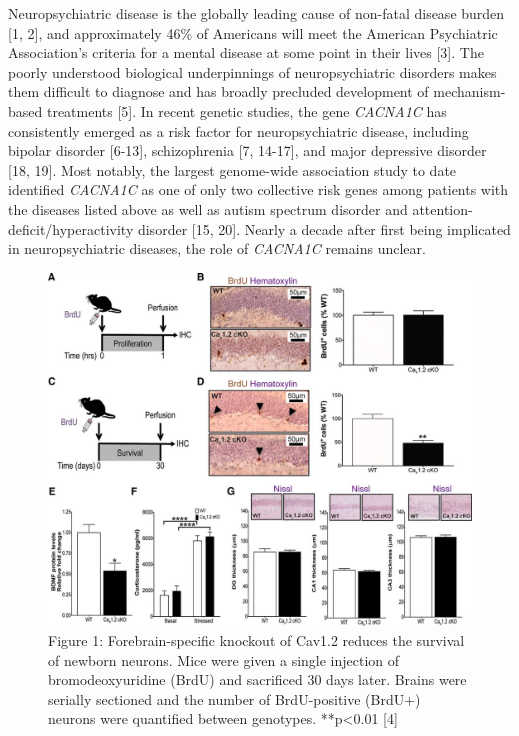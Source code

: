 \documentclass[]{article}
\date{}
\begin{document}
Neuropsychiatric disease is the globally leading cause of non-fatal disease burden {[}1,
2{]}, and approximately 46\% of Americans will meet the American
Psychiatric Association's criteria for a mental disease at some point
in their lives {[}3{]}.
The poorly understood biological underpinnings of neuropsychiatric disorders makes them 
difficult to diagnose and has broadly precluded development of mechanism-based treatments {[}5{]}. 
In recent genetic studies, the gene \emph{CACNA1C} has consistently emerged as a
risk factor for neuropsychiatric disease, including bipolar disorder
{[}6-13{]}, schizophrenia {[}7, 14-17{]}, and major depressive disorder
{[}18, 19{]}.  
Most notably, the largest genome-wide association study to
date identified \emph{CACNA1C} as one of only two collective risk genes
among patients with the diseases listed above as well as autism spectrum
disorder and attention-deficit/hyperactivity disorder {[}15, 20{]}. 
Nearly a decade after first being implicated in neuropsychiatric diseases, the role of
\emph{CACNA1C} remains unclear.

\begin{figure}[h]
\includegraphics{image.jpg}
	\caption{Figure 1: Forebrain-specific knockout of Cav1.2 reduces the survival of newborn neurons.
		Mice were given a single injection of bromodeoxyuridine (BrdU) and sacrificed 30 days later. Brains were serially sectioned and the number of BrdU-positive (BrdU+) neurons were quantified between genotypes. **p<0.01 [4]}
\end{figure}
\end{document}
